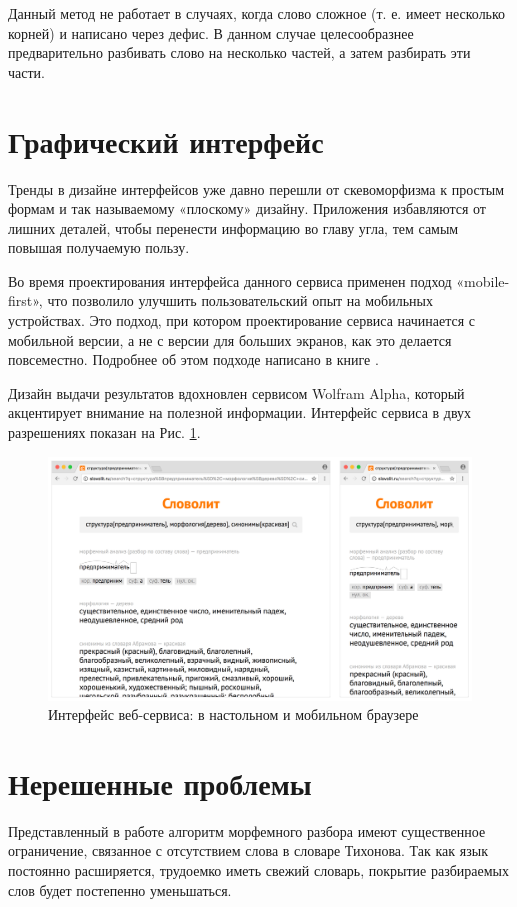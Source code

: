 \documentclass[a4paper,12pt]{article}
\begin{document}
Данный метод не работает в случаях, когда слово сложное (т. е. имеет несколько корней) и написано через дефис. В данном случае целесообразнее предварительно разбивать слово на несколько частей, а затем разбирать эти части.

\section{Графический интерфейс}
Тренды в дизайне интерфейсов уже давно перешли от скевоморфизма к простым формам и так называемому «плоскому» дизайну. Приложения избавляются от лишних деталей, чтобы перенести информацию во главу угла, тем самым повышая получаемую пользу.

Во время проектирования интерфейса данного сервиса применен подход «mobile-first», что позволило улучшить пользовательский опыт на мобильных устройствах. Это подход, при котором проектирование сервиса начинается с мобильной версии, а не с версии для больших экранов, как это делается повсеместно. Подробнее об этом подходе написано в книге \cite{mobile_first}.

Дизайн выдачи результатов вдохновлен сервисом Wolfram Alpha, который акцентирует внимание на полезной информации. Интерфейс сервиса в двух разрешениях показан на Рис. \ref{fig:interface}.

\begin{figure}[ht!]
\centering
\includegraphics[scale=0.18]{interface}
\caption{Интерфейс веб-сервиса: в настольном и мобильном браузере}
\label{fig:interface}
\end{figure}

\section{Нерешенные проблемы}
Представленный в работе алгоритм морфемного разбора имеют существенное ограничение, связанное с отсутствием слова в словаре Тихонова. Так как язык постоянно расширяется, трудоемко иметь свежий словарь, покрытие разбираемых слов будет постепенно уменьшаться.
\end{document}

